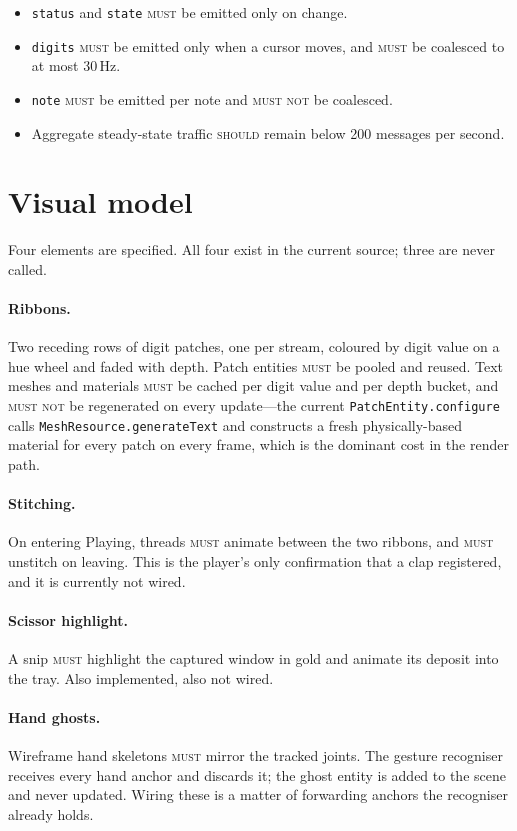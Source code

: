 \documentclass[11pt,a4paper]{article}
\newcommand{\MUST}{\textsc{must}}
\newcommand{\MUSTNOT}{\textsc{must not}}
\newcommand{\SHOULD}{\textsc{should}}
\theoremstyle{definition}
\theoremstyle{plain}
\theoremstyle{remark}
\begin{document}
\begin{itemize}[leftmargin=*]
\item \texttt{status} and \texttt{state} \MUST{} be emitted only on change.
\item \texttt{digits} \MUST{} be emitted only when a cursor moves, and \MUST{} be coalesced to at
      most 30\,Hz.
\item \texttt{note} \MUST{} be emitted per note and \MUSTNOT{} be coalesced.
\item Aggregate steady-state traffic \SHOULD{} remain below 200 messages per second.
\end{itemize}

\section{Visual model}

Four elements are specified. All four exist in the current source; three are never called.

\paragraph{Ribbons.} Two receding rows of digit patches, one per stream, coloured by digit value on
a hue wheel and faded with depth. Patch entities \MUST{} be pooled and reused. Text meshes and
materials \MUST{} be cached per digit value and per depth bucket, and \MUSTNOT{} be regenerated on
every update---the current \texttt{PatchEntity.configure} calls
\texttt{MeshResource.generateText} and constructs a fresh physically-based material for every patch
on every frame, which is the dominant cost in the render path.

\paragraph{Stitching.} On entering \textsf{Playing}, threads \MUST{} animate between the two
ribbons, and \MUST{} unstitch on leaving. This is the player's only confirmation that a clap
registered, and it is currently not wired.

\paragraph{Scissor highlight.} A snip \MUST{} highlight the captured window in gold and animate its
deposit into the tray. Also implemented, also not wired.

\paragraph{Hand ghosts.} Wireframe hand skeletons \MUST{} mirror the tracked joints. The gesture
recogniser receives every hand anchor and discards it; the ghost entity is added to the scene and
never updated. Wiring these is a matter of forwarding anchors the recogniser already holds.
\end{document}

